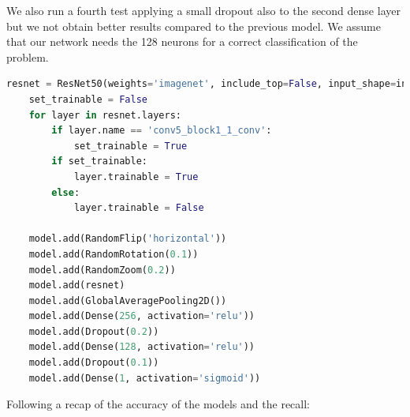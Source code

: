 We also run a fourth test applying a small dropout also to the second dense layer but we not obtain better results compared to the previous model. We assume that our network needs the 128 neurons for a correct classification of the problem. 
\begin{lstlisting}[language=python, caption={ResNet50 Fourth test}, label={lst:resnet50CodeFourthTest}]
    resnet = ResNet50(weights='imagenet', include_top=False, input_shape=input_shape)
    set_trainable = False
    for layer in resnet.layers:
        if layer.name == 'conv5_block1_1_conv':
            set_trainable = True
        if set_trainable:
            layer.trainable = True
        else:
            layer.trainable = False

    model.add(RandomFlip('horizontal'))
    model.add(RandomRotation(0.1))
    model.add(RandomZoom(0.2))
    model.add(resnet)
    model.add(GlobalAveragePooling2D())
    model.add(Dense(256, activation='relu'))
    model.add(Dropout(0.2))
    model.add(Dense(128, activation='relu'))
    model.add(Dropout(0.1))
    model.add(Dense(1, activation='sigmoid'))
\end{lstlisting}


Following a recap of the accuracy of the models and the recall:

\begin{table}[!h]
    \centering
    \caption{ResNet50 accuracy and recall}
    \label{tab:ResNet50}
    \end{table}

